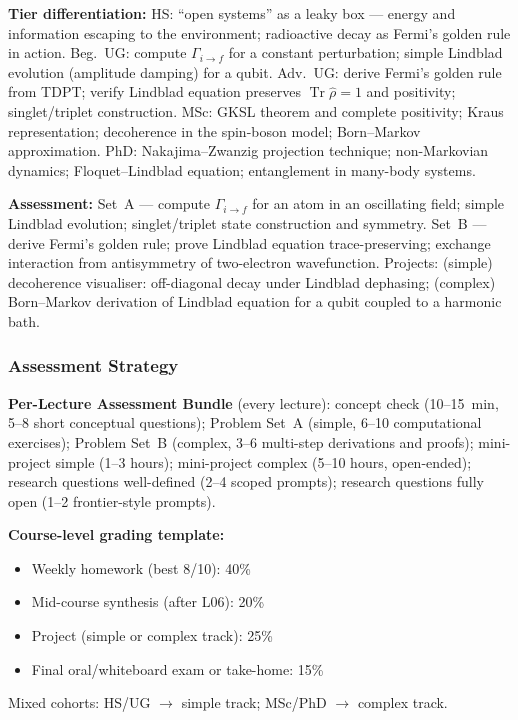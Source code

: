 \documentclass[11pt,a4paper]{article}
\begin{document}
\begin{tcolorbox}[modulebox, title={Module~I.3 / L10: Time-Dependent PT, Open Systems, and Many-Body Preview}]
\medskip\textbf{Tier differentiation:}
HS: ``open systems'' as a leaky box --- energy and information escaping to the environment;
radioactive decay as Fermi's golden rule in action.
Beg.\ UG: compute $\Gamma_{i\to f}$ for a constant perturbation;
simple Lindblad evolution (amplitude damping) for a qubit.
Adv.\ UG: derive Fermi's golden rule from TDPT; verify Lindblad equation
preserves $\operatorname{Tr}\hat{\rho}=1$ and positivity; singlet/triplet construction.
MSc: GKSL theorem and complete positivity; Kraus representation;
decoherence in the spin-boson model; Born--Markov approximation.
PhD: Nakajima--Zwanzig projection technique; non-Markovian dynamics;
Floquet--Lindblad equation; entanglement in many-body systems.

\medskip\textbf{Assessment:}
Set~A --- compute $\Gamma_{i\to f}$ for an atom in an oscillating field;
simple Lindblad evolution; singlet/triplet state construction and symmetry.
Set~B --- derive Fermi's golden rule; prove Lindblad equation trace-preserving;
exchange interaction from antisymmetry of two-electron wavefunction.
Projects: (simple) decoherence visualiser: off-diagonal decay under Lindblad dephasing;
(complex) Born--Markov derivation of Lindblad equation for a qubit coupled to a harmonic bath.
\end{tcolorbox}

\medskip
\subsubsection*{Assessment Strategy}

\begin{tcolorbox}[highlightbox]
\textbf{Per-Lecture Assessment Bundle} (every lecture):
concept check (10--15~min, 5--8 short conceptual questions);
Problem Set~A (simple, 6--10 computational exercises);
Problem Set~B (complex, 3--6 multi-step derivations and proofs);
mini-project simple (1--3 hours);
mini-project complex (5--10 hours, open-ended);
research questions well-defined (2--4 scoped prompts);
research questions fully open (1--2 frontier-style prompts).
\end{tcolorbox}

\medskip
\noindent\textbf{Course-level grading template:}
\begin{itemize}[leftmargin=1.5em]
  \item Weekly homework (best 8/10): 40\%
  \item Mid-course synthesis (after L06): 20\%
  \item Project (simple or complex track): 25\%
  \item Final oral/whiteboard exam or take-home: 15\%
\end{itemize}
Mixed cohorts: HS/UG $\to$ simple track; MSc/PhD $\to$ complex track.
\end{document}
